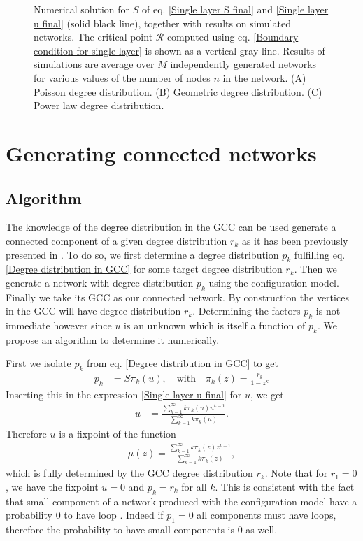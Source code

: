 \documentclass[
11pt, %
english, %
singlespacing, %
nolistspacing, %
liststotoc, %
headsepline, %
]{MastersDoctoralThesis} %
\begin{document}
{\begin{figure}
	\caption{Numerical solution for $S$ of eq. \eqref{Single layer S final} and \eqref{Single layer u final} (solid black line), together with results on simulated networks. The critical point $\mathcal{R}$ computed using eq. \eqref{Boundary condition for single layer} is shown as a vertical gray line. Results of simulations are average over $M$ independently generated networks for various values of the number of nodes $n$ in the network. (A) Poisson degree distribution. (B) Geometric degree distribution. (C) Power law degree distribution.}
	\label{Figure: Single layer S simulation}
\end{figure}
}

\section{Generating connected networks}
\label{Section: Generating connected networks}

\subsection{Algorithm}

The knowledge of the degree distribution in the GCC can be used generate a connected component of a given degree distribution $r_k$ as it has been previously presented in \cite{bialas2008correlations}. To do so, we first determine a degree distribution $p_k$ fulfilling eq. \eqref{Degree distribution in GCC} for some target degree distribution $r_k$. Then we generate a network with degree distribution $p_k$ using the configuration model. Finally we take its GCC as our connected network. By construction the vertices in the GCC will have degree distribution $r_k$. Determining the factors $p_k$ is not immediate however since $u$ is an unknown which is itself a function of $p_k$. We propose an algorithm to determine it numerically.

First we isolate $p_k$ from eq. \eqref{Degree distribution in GCC} to get
\begin{align}
	p_k &= S \pi_k(u), \quad \text{with} \quad \pi_k(z) = \frac{r_k}{1 - z^k}
\end{align}
Inserting this in the expression \eqref{Single layer u final} for $u$, we get
\begin{align}
	u &= \frac{\sum_{k=1}^\infty k \pi_k(u) u^{k-1}}{\sum_{k=1}^\infty k \pi_k(u)}. \label{Fixpoint equation for u}
\end{align}
Therefore $u$ is a fixpoint of the function
\begin{align}
	\mu(z) = \frac{\sum_{k=1}^\infty k \pi_k(z) z^{k-1}}{\sum_{k=1}^\infty k \pi_k(z)}, \label{Defition of mu}
\end{align}
which is fully determined by the GCC degree distribution $r_k$. Note that for $r_1 = 0$, we have the fixpoint $u = 0$ and $p_k = r_k$ for all $k$. This is consistent with the fact that small component of a network produced with the configuration model have a probability $0$ to have loop \cite{newman2010networks}. Indeed if $p_1 = 0$ all components must have loops, therefore the probability to have small components is $0$ as well.
\end{document}
